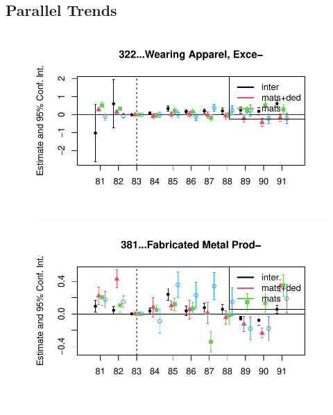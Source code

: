 \documentclass[
  12pt]{article}
\theoremstyle{definition}
\theoremstyle{remark}
\begin{document}
\begin{table}
\begin{minipage}{\linewidth}
\end{minipage}%

\end{table}%

\subsection{Parallel Trends}\label{parallel-trends}

\begin{figure}

\begin{minipage}{\linewidth}

\includegraphics{Tax-Prod_files/figure-pdf/unnamed-chunk-11-1.pdf}

\includegraphics{Tax-Prod_files/figure-pdf/unnamed-chunk-11-2.pdf}


\end{minipage}
\end{figure}
\end{document}
